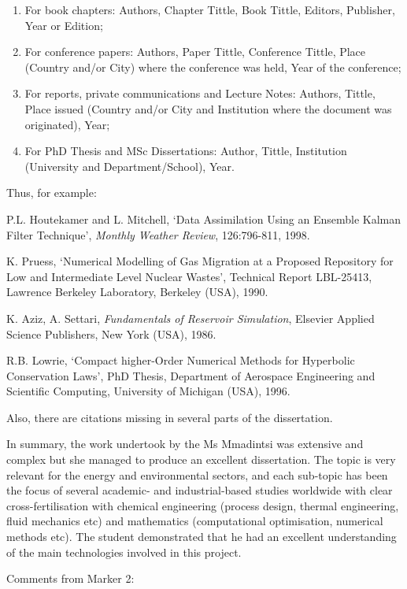 \documentclass[14pt,twoside]{report}
\begin{document}
\begin{enumerate}
\begin{enumerate}
\item For book chapters: Authors, Chapter Tittle, Book Tittle, Editors, Publisher, Year or Edition;
\item For conference papers: Authors, Paper Tittle, Conference Tittle, Place (Country and/or City) where the conference was held, Year of the conference;
\item For reports, private communications and Lecture Notes: Authors, Tittle, Place issued (Country and/or City and Institution where the document was originated), Year;
\item For PhD Thesis and MSc Dissertations: Author, Tittle, Institution (University and Department/School), Year.
\end{enumerate}  
Thus, for example:
\begin{enumerate}[label={[\arabic*]}]
\item P.L. Houtekamer and L. Mitchell, `Data Assimilation Using an Ensemble Kalman Filter Technique', {\it Monthly Weather Review}, 126:796-811, 1998.
\item K. Pruess, `Numerical Modelling of Gas Migration at a Proposed Repository for Low and Intermediate Level Nuclear Wastes', Technical Report LBL-25413, Lawrence Berkeley Laboratory, Berkeley (USA), 1990.
\item K. Aziz, A. Settari, {\it Fundamentals of Reservoir Simulation}, Elsevier Applied Science Publishers, New York (USA), 1986.
\item R.B. Lowrie, `Compact higher-Order Numerical Methods for Hyperbolic Conservation Laws', PhD Thesis, Department of Aerospace Engineering and Scientific Computing, University of Michigan (USA), 1996.
\end{enumerate}
Also, there are citations missing in several parts of the dissertation.
%
\end{enumerate}
In summary, the work undertook by the Ms Mmadintsi was extensive and complex but she managed to produce an excellent dissertation. The topic is very relevant for the energy and environmental sectors, and each sub-topic has been the focus of several academic- and industrial-based studies worldwide with clear cross-fertilisation with chemical engineering (process design, thermal engineering, fluid mechanics etc) and mathematics (computational optimisation, numerical methods etc). The student demonstrated that he had an excellent understanding of the main technologies involved in this project.

\bigskip

\noindent
    {\Large Comments from Marker 2:}
\end{document}
